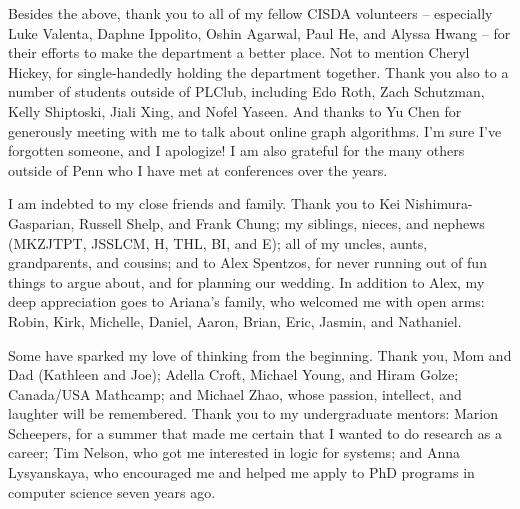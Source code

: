 Besides the above, thank you to all of my fellow CISDA volunteers -- especially Luke Valenta, Daphne Ippolito, Oshin Agarwal, Paul He, and Alyssa Hwang -- for their efforts to make the department a better place.
Not to mention Cheryl Hickey, for single-handedly holding the department together.
Thank you also to a number of students outside of PLClub, including
Edo Roth, Zach Schutzman, Kelly Shiptoski, Jiali Xing, and Nofel Yaseen.
And thanks to Yu Chen for generously meeting with me to talk about online graph algorithms.
I'm sure I've forgotten someone, and I apologize!
I am also grateful for the many others outside of Penn who I have met at conferences over the years.

I am indebted to my close friends and family. Thank you to Kei Nishimura-Gasparian, Russell Shelp, and Frank Chung; my siblings, nieces, and nephews (MKZJTPT, JSSLCM, H, THL, BI, and E); all of my uncles, aunts, grandparents, and cousins; and to Alex Spentzos, for never running out of fun things to argue about, and for planning our wedding. In addition to Alex, my deep appreciation goes to Ariana's family, who welcomed me with open arms: Robin, Kirk, Michelle, Daniel, Aaron, Brian, Eric, Jasmin, and Nathaniel.

Some have sparked my love of thinking from the beginning.
Thank you, Mom and Dad (Kathleen and Joe);
Adella Croft, Michael Young, and Hiram Golze;
Canada/USA Mathcamp;
and Michael Zhao,
whose passion, intellect, and laughter will be remembered.
Thank you to my undergraduate mentors: Marion Scheepers, for a summer that made me certain that I wanted to do research as a career;
Tim Nelson, who got me interested in logic for systems;
and Anna Lysyanskaya, who encouraged me and helped me apply to PhD programs in computer science seven years ago.
